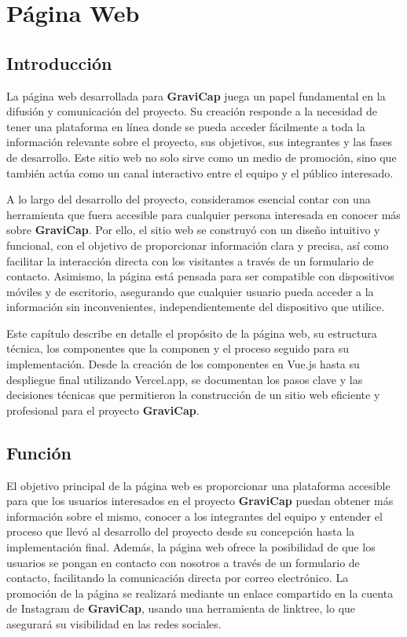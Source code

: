 \chapter{Página Web}
    
    \section{Introducción}
    
        La página web desarrollada para \textcolor{dark_violet}{\textbf{GraviCap}} juega un papel fundamental en la difusión y comunicación del proyecto. Su creación responde a la necesidad de tener una plataforma en línea donde se pueda acceder fácilmente a toda la información relevante sobre el proyecto, sus objetivos, sus integrantes y las fases de desarrollo. Este sitio web no solo sirve como un medio de promoción, sino que también actúa como un canal interactivo entre el equipo y el público interesado.\par
        A lo largo del desarrollo del proyecto, consideramos esencial contar con una herramienta que fuera accesible para cualquier persona interesada en conocer más sobre \textcolor{dark_violet}{\textbf{GraviCap}}. Por ello, el sitio web se construyó con un diseño intuitivo y funcional, con el objetivo de proporcionar información clara y precisa, así como facilitar la interacción directa con los visitantes a través de un formulario de contacto. Asimismo, la página está pensada para ser compatible con dispositivos móviles y de escritorio, asegurando que cualquier usuario pueda acceder a la información sin inconvenientes, independientemente del dispositivo que utilice.\par
        Este capítulo describe en detalle el propósito de la página web, su estructura técnica, los componentes que la componen y el proceso seguido para su implementación. Desde la creación de los componentes en Vue.js hasta su despliegue final utilizando Vercel.app, se documentan los pasos clave y las decisiones técnicas que permitieron la construcción de un sitio web eficiente y profesional para el proyecto \textcolor{dark_violet}{\textbf{GraviCap}}.\par

    \section{Función}
        El objetivo principal de la página web es proporcionar una plataforma accesible para que los usuarios interesados en el proyecto \textcolor{dark_violet}{\textbf{GraviCap}} puedan obtener más información sobre el mismo, conocer a los integrantes del equipo y entender el proceso que llevó al desarrollo del proyecto desde su concepción hasta la implementación final. Además, la página web ofrece la posibilidad de que los usuarios se pongan en contacto con nosotros a través de un formulario de contacto, facilitando la comunicación directa por correo electrónico. La promoción de la página se realizará mediante un enlace compartido en la cuenta de Instagram de \textcolor{dark_violet}{\textbf{GraviCap}}, usando una herramienta de linktree, lo que asegurará su visibilidad en las redes sociales.\par
        
